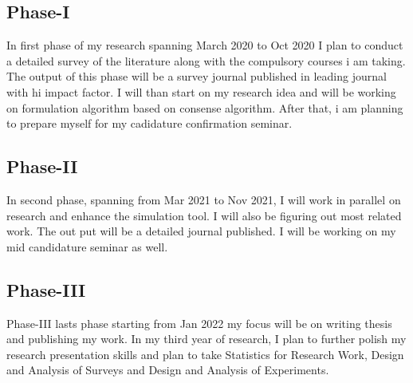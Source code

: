 \documentclass[10pt]{llncs}
\begin{document}
\subsection{Phase-I}
In first phase of my research spanning March 2020 to Oct 2020 I plan to conduct a detailed survey of the literature along with the compulsory courses i am taking. The output of this phase will be a survey journal published in leading journal with hi impact factor. I will than start on my research idea and will be working on formulation algorithm based on consense algorithm. After that, i am planning to prepare myself for my cadidature confirmation seminar.

%
\subsection{Phase-II}
In second phase, spanning from Mar 2021 to Nov 2021, I will work in parallel on research and enhance the simulation tool. I will also be figuring out most related work. The out put will be a detailed journal published. I will be working on my mid candidature seminar as well.

%
\subsection{Phase-III}
Phase-III lasts phase starting from Jan 2022 my focus will be on writing thesis and publishing my work.
In my third year of research, I plan to further polish my research presentation skills and plan to take Statistics for Research Work, Design and Analysis of Surveys and Design and Analysis of Experiments.

%

%

\footnotesize{
%
%
}
%
\end{document}
